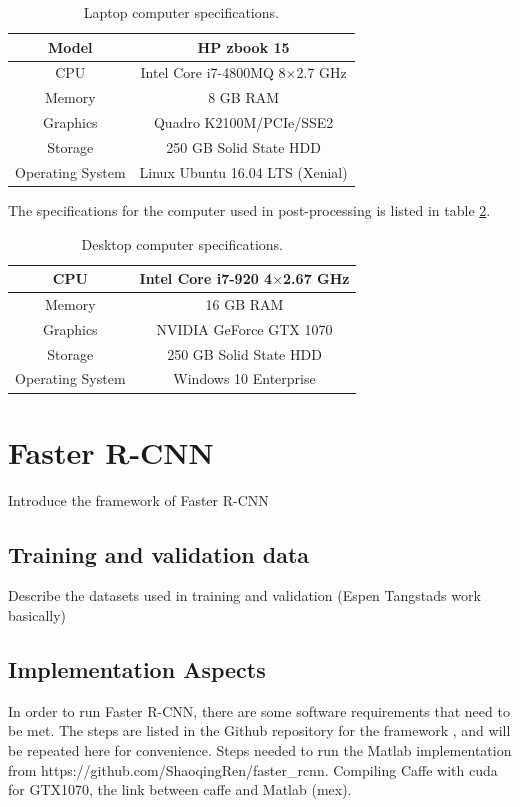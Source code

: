 \begin{table}[H]
	\centering
	\begin{tabular}[H]{|c|c|}\hline
	Model & HP zbook 15\\\hline
	CPU & Intel Core i7-4800MQ 8$\times$2.7 GHz \\\hline
	Memory & 8 GB RAM \\\hline
	Graphics & Quadro K2100M/PCIe/SSE2 \\\hline
	Storage & 250 GB Solid State HDD \\\hline
	Operating System & Linux Ubuntu 16.04 LTS (Xenial)\\
	\hline
	\end{tabular}
	\caption{Laptop computer specifications.}
	\label{tab:comp_specs_laptop}
\end{table}
The specifications for the computer used in post-processing is listed in table \ref{tab:comp_specs_desktop}.
\begin{table}[H]
	\centering
	\begin{tabular}[H]{|c|c|}\hline
		CPU & Intel Core i7-920 4$\times$2.67 GHz \\\hline
		Memory & 16 GB RAM \\\hline
		Graphics &  NVIDIA GeForce GTX 1070\\\hline
		Storage & 250 GB Solid State HDD \\\hline
		Operating System & Windows 10 Enterprise\\
		\hline
	\end{tabular}
	\caption{Desktop computer specifications.}
	\label{tab:comp_specs_desktop}
\end{table}

\section{Faster R-CNN}
Introduce the framework of Faster R-CNN
\subsection{Training and validation data}
Describe the datasets used in training and validation (Espen Tangstads work basically)
\subsection{Implementation Aspects}
In order to run Faster R-CNN, there are some software requirements that need to be met. The steps are listed in the Github repository for the framework \cite{faster_rcnn_git}, and will be repeated here for convenience.
Steps needed to run the Matlab implementation from https://github.com/ShaoqingRen/faster\_rcnn. Compiling Caffe with cuda for GTX1070, the link between caffe and Matlab (mex).
